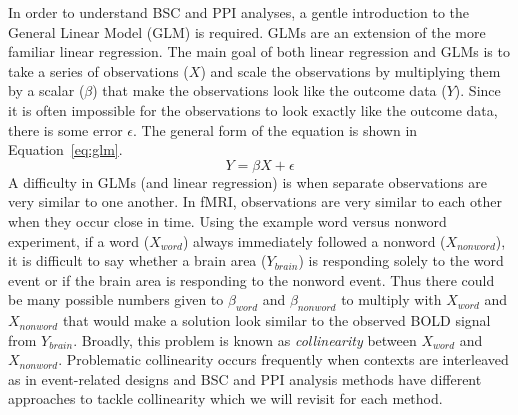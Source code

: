 \documentclass[phd,figures,tables,ackpage,abstractpage,publicabstractpage]{uithesis}
\begin{document}
In order to understand BSC and PPI analyses, a gentle introduction to the
General Linear Model (GLM) is required.
GLMs are an extension of the more familiar linear regression.
The main goal of both linear regression and GLMs is to take
a series of observations ($X$) and scale the observations by
multiplying them by a scalar ($\beta$) that make the observations
look like the outcome data ($Y$).
Since it is often impossible for the observations to look exactly like
the outcome data, there is some error $\epsilon$.
The general form of the equation is shown in Equation~\ref{eq:glm}.
\begin{equation}
  Y = \beta X + \epsilon
  \label{eq:glm}
\end{equation}
A difficulty in GLMs (and linear regression) is when separate observations are very similar to one another.
In fMRI, observations are very similar to each other when they occur close in time.
Using the example word versus nonword experiment, if a word ($X_{word}$) always immediately
followed a nonword ($X_{nonword}$), it is difficult to say whether
a brain area ($Y_{brain}$) is responding solely to the word event
or if the brain area is responding to the nonword event.
Thus there could be many possible numbers given to $\beta_{word}$ and $\beta_{nonword}$
to multiply with $X_{word}$ and $X_{nonword}$ that would make a solution look similar to
the observed BOLD signal from $Y_{brain}$.
Broadly, this problem is known as \textit{collinearity} between $X_{word}$ and $X_{nonword}$. 
Problematic collinearity occurs frequently when contexts are interleaved as in event-related designs and
BSC and PPI analysis methods have different approaches to tackle collinearity
which we will revisit for each method.
\end{document}
